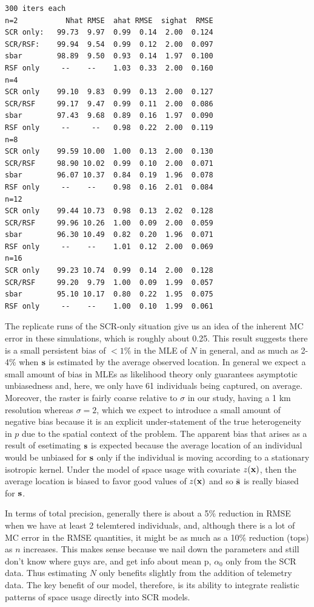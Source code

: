 \begin{verbatim}
300 iters each 
n=2           Nhat RMSE  ahat RMSE  sighat  RMSE
SCR only:   99.73  9.97  0.99  0.14  2.00  0.124
SCR/RSF:    99.94  9.54  0.99  0.12  2.00  0.097
sbar        98.89  9.50  0.93  0.14  1.97  0.100
RSF only     --    --    1.03  0.33  2.00  0.160
n=4
SCR only    99.10  9.83  0.99  0.13  2.00  0.127
SCR/RSF     99.17  9.47  0.99  0.11  2.00  0.086
sbar        97.43  9.68  0.89  0.16  1.97  0.090
RSF only     --     --   0.98  0.22  2.00  0.119
n=8
SCR only    99.59 10.00  1.00  0.13  2.00  0.130
SCR/RSF     98.90 10.02  0.99  0.10  2.00  0.071
sbar        96.07 10.37  0.84  0.19  1.96  0.078
RSF only     --    --    0.98  0.16  2.01  0.084
n=12
SCR only    99.44 10.73  0.98  0.13  2.02  0.128
SCR/RSF     99.96 10.26  1.00  0.09  2.00  0.059
sbar        96.30 10.49  0.82  0.20  1.96  0.071
RSF only     --    --    1.01  0.12  2.00  0.069
n=16
SCR only    99.23 10.74  0.99  0.14  2.00  0.128
SCR/RSF     99.20  9.79  1.00  0.09  1.99  0.057
sbar        95.10 10.17  0.80  0.22  1.95  0.075
RSF only     --    --    1.00  0.10  1.99  0.061
\end{verbatim}


The replicate runs of the SCR-only situation give us an idea of the
inherent MC error in these simulations, which is roughly about
0.25. This result suggests there is a small persistent bias of $< 1\%$
in the MLE of $N$ in general, and as much as 2-4\% when ${\bf s}$ is
estimated by the average observed location.  In general we expect a
small amount of bias in MLEs as likelihood theory only guarantees
asymptotic unbiasedness and, here, we only have 61 individuals being
captured, on average.  Moreover, the raster is fairly coarse relative
to $\sigma$ in our study, having a 1 km resolution whereas $\sigma =
2$, which we expect to introduce a small amount of negative bias
because it is an explicit under-statement of the true heterogeneity in
$p$ due to the spatial context of the problem.  The apparent bias that
arises as a result of esetimating ${\bf s}$ is expected because the
average location of an individual would be unbiased for ${\bf s}$ only
if the individual is moving according to a stationary isotropic
kernel. Under the model of space usage with covariate $z({\bf x})$,
then the average location is biased to favor good values of $z({\bf
  x})$ and so $\bar{\bf s}$ is really biased for ${\bf s}$.

In terms of total precision, generally there is about a 5\% reduction
in RMSE when we have at least 2 telemtered individuals, and, although
there is a lot of MC error in the RMSE quantities, it might be as much
as a 10\% reduction (tops) as $n$ increases. This makes sense because
we nail down the parameters and still don't know where guys are, and
get info about mean p, $\alpha_{0}$ only from the SCR data. Thus
estimating $N$ only benefits slightly from the addition of telemetry
data.  The key benefit of our model, therefore, is its ability to
integrate realistic patterns of space usage directly into SCR models.

